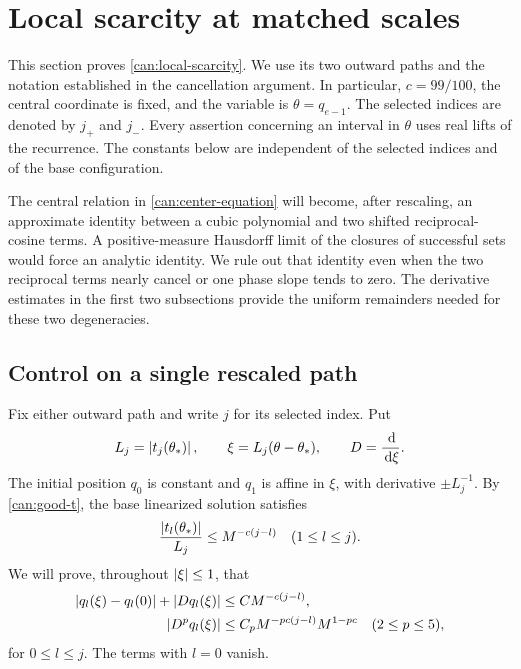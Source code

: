 \section{Local scarcity at matched scales}
\label{loc:section}

This section proves \cref{can:local-scarcity}. We use its two outward
paths and the notation established in the cancellation argument. In
particular, $c=99/100$, the central coordinate is fixed, and the variable
is $\theta=q_{e-1}$. The selected indices are denoted by $j_+$ and
$j_-$. Every assertion concerning an interval in $\theta$ uses real
lifts of the recurrence. The constants below are independent of the
selected indices and of the base configuration.

The central relation in \cref{can:center-equation} will become, after rescaling, an approximate
identity between a cubic polynomial and two shifted reciprocal-cosine
terms. A positive-measure Hausdorff limit of the closures of successful
sets would force an analytic identity. We rule out that identity even when the two
reciprocal terms nearly cancel or one phase slope tends to zero. The
derivative estimates in the first two subsections provide the uniform
remainders needed for these two degeneracies.

\subsection{Control on a single rescaled path}

Fix either outward path and write $j$ for its selected index. Put
\[
 L_j=\left\lvert t_j(\theta_*)\right\rvert,\qquad
 \xi=L_j(\theta-\theta_*),\qquad D=\frac{\,\mathrm{d}}{\,\mathrm{d}\xi}.
\]
The initial position $q_0$ is constant and $q_1$ is affine in $\xi$,
with derivative $\pm L_j^{-1}$. By \cref{can:good-t}, the base
linearized solution satisfies
\begin{equation}
 \frac{\left\lvert t_l(\theta_*)\right\rvert}{L_j}
 \le M^{-c(j-l)}\quad(1\le l\le j).
 \label{loc:base-growth}
\end{equation}
We will prove, throughout $\left\lvert\xi\right\rvert\le1$, that
\begin{align}
 \left\lvert q_l(\xi)-q_l(0)\right\rvert+\left\lvert Dq_l(\xi)\right\rvert
 &\le C M^{-c(j-l)}, \label{loc:first-derivatives}\\
 \left\lvert D^p q_l(\xi)\right\rvert
 &\le C_p M^{-pc(j-l)}M^{1-pc}
 \quad(2\le p\le5), \label{loc:higher-derivatives}
\end{align}
for $0\le l\le j$. The terms with $l=0$ vanish.

